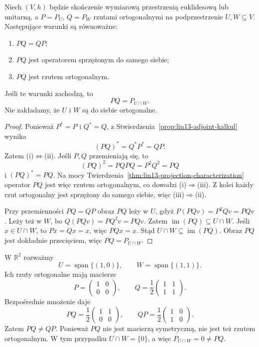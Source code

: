 \begin{twierdzenie}
\label{thm:lin13-commuting-projections}
Niech \((V,h)\) będzie skończenie
wymiarową przestrzenią
euklidesową lub unitarną,
a \(P=P_U\), \(Q=P_W\)
rzutami ortogonalnymi na
podprzestrzenie \(U,W\subseteq V\).
Następujące warunki są równoważne:
\begin{enumerate}[label=(\roman*)]
 \item \(PQ=QP\);
 \item \(PQ\) jest operatorem
       sprzężonym do samego siebie;
 \item \(PQ\) jest rzutem
       ortogonalnym.
\end{enumerate}
Jeśli te warunki zachodzą, to
\[
 PQ=P_{U\cap W}.
\]
Nie zakładamy, że \(U\) i \(W\)
są do siebie ortogonalne.
\end{twierdzenie}
\begin{proof}
Ponieważ \(P^*=P\) i
\(Q^*=Q\), z
Stwierdzenia~\ref{prop:lin13-adjoint-kalkul}
wynika
\[
 (PQ)^*=Q^*P^*=QP.
\]
Zatem (i)\(\iff\)(ii).
Jeśli \(P,Q\) przemieniają się,
to
\[
 (PQ)^2=PQPQ=P^2Q^2=PQ
\]
i \((PQ)^*=PQ\).
Na mocy
Twierdzenia~\ref{thm:lin13-projection-characterization}
operator \(PQ\) jest więc
rzutem ortogonalnym,
co dowodzi (i)\(\Rightarrow\)(iii).
Z kolei każdy rzut ortogonalny
jest sprzężony do samego
siebie, więc (iii)\(\Rightarrow\)(ii).

Przy przemienności \(PQ=QP\)
obraz \(PQ\) leży w \(U\),
gdyż \(P(PQv)=P^2Qv=PQv\).
Leży też w \(W\), bo
\(Q(PQv)=P Q^2v=PQv\).
Zatem
\(\operatorname{im}(PQ)\subseteq U\cap W\).
Jeśli \(x\in U\cap W\), to
\(Px=Qx=x\), więc \(PQx=x\).
Stąd \(U\cap W\subseteq
\operatorname{im}(PQ)\).
Obraz \(PQ\) jest dokładnie
przecięciem, więc \(PQ=P_{U\cap W}\).
\end{proof}

\begin{przyklad}
\label{prz:lin13-noncommuting}
W \(\mathbb R^2\) rozważmy
\[
 U=\operatorname{span}\{(1,0)\},
 \qquad
 W=\operatorname{span}\{(1,1)\}.
\]
Ich rzuty ortogonalne mają macierze
\[
 P=\begin{pmatrix}1&0\\0&0\end{pmatrix},
 \qquad
 Q=\frac12\begin{pmatrix}1&1\\1&1\end{pmatrix}.
\]
Bezpośrednie mnożenie daje
\[
 PQ=\frac12\begin{pmatrix}1&1\\0&0\end{pmatrix},
 \qquad
 QP=\frac12\begin{pmatrix}1&0\\1&0\end{pmatrix}.
\]
Zatem \(PQ\ne QP\).
Ponieważ \(PQ\) nie jest
macierzą symetryczną,
nie jest też rzutem
ortogonalnym.
W tym przypadku
\(U\cap W=\{0\}\),
a więc \(P_{U\cap W}=0\ne PQ\).
\end{przyklad}

